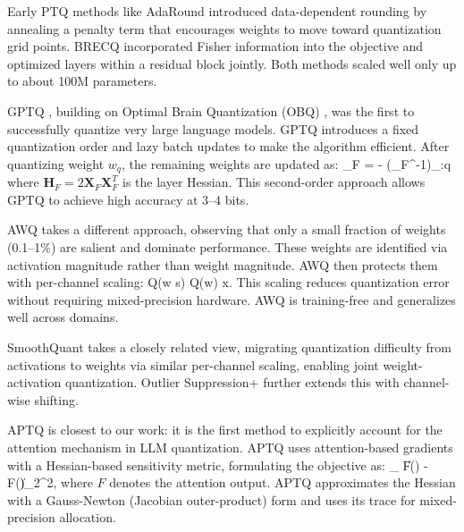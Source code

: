 \documentclass[10pt,twocolumn,letterpaper]{article}
\let\oldequation\equation
\let\oldendequation\endequation
\renewenvironment{equation}{\oldequation\small}{\oldendequation}
\begin{document}
Early PTQ methods like AdaRound \cite{nagel2020adaptive} introduced data-dependent rounding by annealing a penalty term that encourages weights to move toward quantization grid points. BRECQ \cite{li2021brecq} incorporated Fisher information into the objective and optimized layers within a residual block jointly. Both methods scaled well only up to about 100M parameters.

GPTQ \cite{gptq}, building on Optimal Brain Quantization (OBQ) \cite{frantar2022obq}, was the first to successfully quantize very large language models. GPTQ introduces a fixed quantization order and lazy batch updates to make the algorithm efficient. After quantizing weight $w_q$, the remaining weights are updated as:
\begin{equation}
\delta_F = - \cdot (_F^{-1})_{:q}
\end{equation}
where $\mathbf{H}_F = 2\mathbf{X}_F\mathbf{X}_F^T$ is the layer Hessian. This second-order approach allows GPTQ to achieve high accuracy at 3--4 bits.

AWQ \cite{lin2024awq} takes a different approach, observing that only a small fraction of weights (0.1--1\%) are salient and dominate performance. These weights are identified via activation magnitude rather than weight magnitude. AWQ then protects them with per-channel scaling:
\begin{equation}
Q(w \cdot s) \cdot {} \approx Q(w) \cdot x.
\end{equation}
This scaling reduces quantization error without requiring mixed-precision hardware. AWQ is training-free and generalizes well across domains.

SmoothQuant \cite{xiao2023smoothquant} takes a closely related view, migrating quantization difficulty from activations to weights via similar per-channel scaling, enabling joint weight-activation quantization. Outlier Suppression+ \cite{wei2023outlier} further extends this with channel-wise shifting.

APTQ \cite{guan2024aptq} is closest to our work: it is the first method to explicitly account for the attention mechanism in LLM quantization. APTQ uses attention-based gradients with a Hessian-based sensitivity metric, formulating the objective as:
\begin{equation}
\arg\min_{} \|F() - F()\|_2^2,
\end{equation}
where $F$ denotes the attention output. APTQ approximates the Hessian with a Gauss-Newton (Jacobian outer-product) form and uses its trace for mixed-precision allocation.
\end{document}
